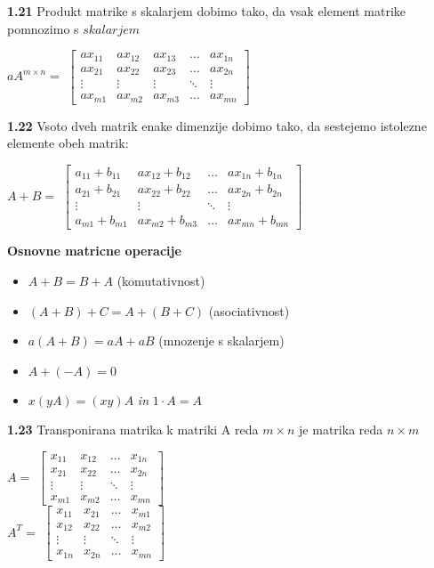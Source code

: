 \documentclass{article}
\begin{document}
\begin{multicols}{4}
\textbf{1.21} Produkt matrike s skalarjem dobimo tako, da 
vsak element matrike pomnozimo s $skalarjem$
\begin{center}
    $aA^{m \times n} =$
    $\begin{bmatrix}
        ax_{11} & ax_{12} & ax_{13} & \dots  & ax_{1n} \\
        ax_{21} & ax_{22} & ax_{23} & \dots  & ax_{2n} \\
        \vdots  & \vdots  & \vdots  & \ddots  & \vdots \\
        ax_{m1} & ax_{m2} & ax_{m3} & \dots  & ax_{mn}
    \end{bmatrix}$
\end{center}

\textbf{1.22} Vsoto dveh matrik enake dimenzije dobimo tako,
da sestejemo istolezne elemente obeh matrik:
\begin{center}
    $A + B =$
    $\begin{bmatrix}
        a_{11} + b_{11} & ax_{12} + b_{12}  & \dots  & ax_{1n} + b_{1n} \\
        a_{21} + b_{21} & ax_{22} + b_{22}  & \dots  & ax_{2n} + b_{2n}\\
        \vdots          & \vdots            & \ddots & \vdots \\
        a_{m1} + b_{m1} & ax_{m2} + b_{m3} & \dots  & ax_{mn} + b_{mn}
    \end{bmatrix}$
\end{center}

\textbf{Osnovne matricne operacije}
\begin{itemize}
    \item $A + B = B + A$ (komutativnost)
    \item $(A + B) + C = A + (B + C)$ (asociativnost)
    \item $a(A + B) = aA + aB$ (mnozenje s skalarjem)
    \item $A + (-A) = 0$
    \item $x(yA) = (xy)A$ \textit{in} $1 \cdot A = A$
\end{itemize}

\textbf{1.23} Transponirana matrika k matriki A reda $m \times n$
je matrika reda $n \times m$
\begin{center}
    $A =$
    $\begin{bmatrix}
        x_{11} & x_{12} & \dots  & x_{1n} \\
        x_{21} & x_{22} & \dots  & x_{2n} \\
        \vdots & \vdots & \ddots & \vdots \\
        x_{m1} & x_{m2} & \dots  & x_{mn}
    \end{bmatrix}$\\
    \smallskip
    $A^{T} =$
    $\begin{bmatrix}
        x_{11} & x_{21} & \dots  & x_{m1} \\
        x_{12} & x_{22} & \dots  & x_{m2} \\
        \vdots & \vdots & \ddots & \vdots \\
        x_{1n} & x_{2n} & \dots  & x_{mn}
    \end{bmatrix}$
\end{center}


\end{multicols}
\end{document}
